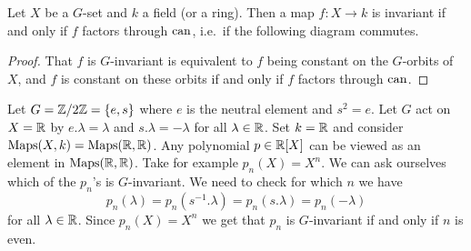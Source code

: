 \begin{lem}
 Let $X$ be a $G$-set and $k$ a field (or a ring). Then a map $f \colon X \to k$ is invariant if and only if $f$ factors through $\operatorname{can}$, i.e.\ if the following diagram commutes.
 \begin{center}
 \end{center}
\end{lem}
\begin{proof}
 That $f$ is $G$-invariant is equivalent to $f$ being constant on the $G$-orbits of $X$, and $f$ is constant on these orbits if and only if $f$ factors through $\operatorname{can}$.
\end{proof}


\begin{expl}
 Let $G = \mathbb{Z}/2\mathbb{Z} = \{e,s\}$ where $e$ is the neutral element and $s^2 = e$. Let $G$ act on $X = \mathbb{R}$ by $e.\lambda = \lambda$ and $s.\lambda = -\lambda$ for all $\lambda \in \mathbb{R}$. Set $k = \mathbb{R}$ and consider $\operatorname{Maps}(X,k) = \operatorname{Maps}(\mathbb{R},\mathbb{R})$. Any polynomial $p \in \mathbb{R}[X]$ can be viewed as an element in $\operatorname{Maps}(\mathbb{R},\mathbb{R})$. Take for example $p_n(X) = X^n$. We can ask ourselves which of the $p_n$’s is $G$-invariant. We need to check for which $n$ we have
 \[
  p_n(\lambda) = p_n\left(s^{-1}.\lambda\right) = p_n(s.\lambda) = p_n(-\lambda)
 \]
 for all $\lambda \in \mathbb{R}$. Since $p_n(X) = X^n$ we get that $p_n$ is $G$-invariant if and only if $n$ is even.
\end{expl}


